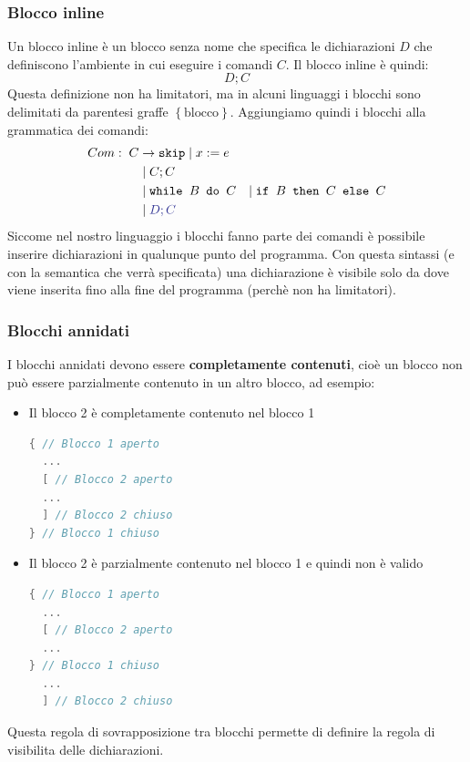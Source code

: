 \documentclass[a4paper]{article}
\begin{document}
\subsubsection{Blocco inline}
Un blocco inline è un blocco senza nome che specifica le dichiarazioni \( D \) che
definiscono l'ambiente in cui eseguire i comandi \( C \). Il blocco inline è
quindi:
\[
  D;C
\] 
Questa definizione non ha limitatori, ma in alcuni linguaggi i blocchi sono
delimitati da parentesi graffe \( \left\{ \text{blocco} \right\} \).
Aggiungiamo quindi i blocchi alla grammatica dei comandi:
\[
  \begin{aligned}
    Com: \; C & \to \texttt{skip} \mid x := e \\
              & \mid C; C  \\
              & \mid \texttt{while } B \texttt{ do } C
              & \mid \texttt{if } B \texttt{ then } C \texttt{ else } C  \\
              & \mid \mathcolor{Blue}{D; C}
  \end{aligned}
\] 
Siccome nel nostro linguaggio i blocchi fanno parte dei comandi è possibile inserire
dichiarazioni in qualunque punto del programma. Con questa sintassi (e con la
semantica che verrà specificata) una dichiarazione è visibile solo da dove viene
inserita fino alla fine del programma (perchè non ha limitatori).

\subsubsection{Blocchi annidati}
I blocchi annidati devono essere \textbf{completamente contenuti}, cioè un blocco non
può essere parzialmente contenuto in un altro blocco, ad esempio:
\begin{itemize}
  \item Il blocco 2 è completamente contenuto nel blocco 1
\begin{lstlisting}[language=C]
{ // Blocco 1 aperto
  ...
  [ // Blocco 2 aperto
  ...
  ] // Blocco 2 chiuso
} // Blocco 1 chiuso
\end{lstlisting}
  \item Il blocco 2 è parzialmente contenuto nel blocco 1 e quindi non è valido
\begin{lstlisting}[language=C]
{ // Blocco 1 aperto
  ...
  [ // Blocco 2 aperto
  ...
} // Blocco 1 chiuso
  ...
  ] // Blocco 2 chiuso
\end{lstlisting}
\end{itemize}
Questa regola di sovrapposizione tra blocchi permette di definire la regola di
visibilita delle dichiarazioni.
\end{document}
